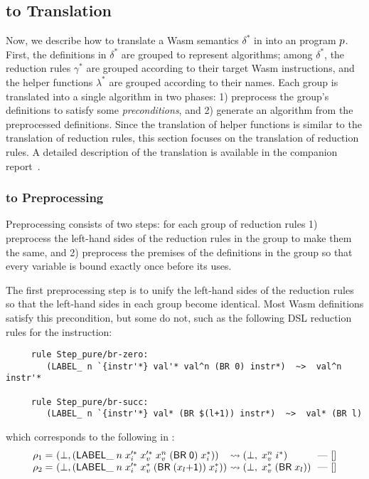 \subsection{\dl to \al Translation}\label{sec:dl2al}
Now, we describe how to translate a Wasm semantics $\delta^*$ in \dl into an \al program $p$.
First, the definitions in $\delta^*$ are grouped to represent algorithms; among $\delta^*$,
the reduction rules $\gamma^*$ are grouped according to their target Wasm instructions, and
the helper functions $\lambda^*$ are grouped according to their names.
Each group is translated into a single algorithm in two phases:
1) preprocess the group's definitions to satisfy some \textit{preconditions}, and
2) generate an \al algorithm from the preprocessed \dl definitions.
Since the translation of helper functions is similar to the translation of reduction rules,
this section focuses on the translation of reduction rules.
A detailed description of the translation is available in the companion report~\cite{il-tr}.

\subsubsection{\dl to \dl Preprocessing}
Preprocessing consists of two steps: for each group of reduction rules
1) preprocess the left-hand sides of the reduction rules
in the group to make them the same, and
2) preprocess the premises of the definitions in the group
so that every variable is bound exactly once before its uses.

\medskip
The first preprocessing step is to unify the left-hand sides of
the reduction rules so that the left-hand sides in each group become identical.
Most Wasm definitions satisfy this precondition, but some do not, such as the following
DSL reduction rules for the  instruction:

{
\begin{verbatim}
     rule Step_pure/br-zero:
        (LABEL_ n `{instr'*} val'* val^n (BR 0) instr*)  ~>  val^n instr'*

     rule Step_pure/br-succ:
        (LABEL_ n `{instr'*} val* (BR $(l+1)) instr*)  ~>  val* (BR l)
\end{verbatim}
}

\noindent
which corresponds to the following in \dl:
\[
\begin{array}{l@{~}l@{~}l@{~}l}
\rho_1 = &(\bot, (\ssf{LABEL\_} \; n \; x_i'^*\; x_v'^*\; x_v^{n}\; (\ssf{BR\; 0})\; x_i^*)) &\leadsto
 (\bot,\; x_v^{n}\; i^*)\ & \mbox{---}\ []\\
\rho_2 = &(\bot, (\ssf{LABEL\_} \; n \; x_i'^*\; x_v^*\; (\ssf{BR\; (}x_l\ssf{+1)})\; x_i^*)) &\leadsto
 (\bot,\; x_v^*\; (\ssf{BR}\; x_l))\ & \mbox{---}\ []
\end{array}
\]

